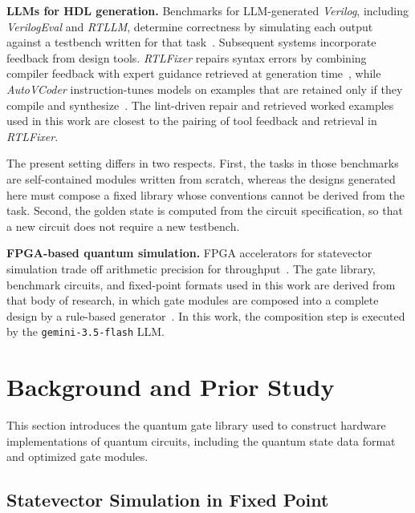 \documentclass[conference]{IEEEtran}
\begin{document}
\noindent\textbf{LLMs for HDL generation.} Benchmarks for LLM-generated \textit{Verilog},
including \textit{VerilogEval} and \textit{RTLLM}, determine correctness by simulating each
output against a testbench written for that
task~\cite{verilogeval2023,rtllm2024}. Subsequent systems incorporate
feedback from design tools. \textit{RTLFixer} repairs syntax errors by
combining compiler feedback with expert guidance retrieved at generation
time~\cite{rtlfixer2024}, while \textit{AutoVCoder} instruction-tunes models
on examples that are retained only if they compile and
synthesize~\cite{autovcoder2024}. The lint-driven repair and retrieved
worked examples used in this work are closest to the pairing of tool
feedback and retrieval in \textit{RTLFixer}. 

The present setting differs in
two respects. First, the tasks in those benchmarks are self-contained
modules written from scratch, whereas the designs generated here must
compose a fixed library whose conventions cannot be derived from the task.
Second, the golden state is computed from the circuit specification, so
that a new circuit does not require a new testbench.

\noindent\textbf{FPGA-based quantum simulation.} FPGA accelerators for statevector simulation trade off arithmetic precision for
throughput~\cite{isqed2026,hpdc26,TurnerICDM2025,vega2023fourier,liang2024pcq}. The gate library, benchmark circuits, and fixed-point formats used in this work are derived from that body of research, in which gate modules are composed into a complete design by a rule-based
generator~\cite{isqed2026}. In this work, the composition step is executed by the \texttt{gemini-3.5-flash} LLM.


\section{Background and Prior Study}
\label{sec:background}
This section introduces the quantum gate library used to construct hardware implementations of quantum circuits, including the quantum state data format and optimized gate modules.

\subsection{Statevector Simulation in Fixed Point}
\label{subsec:statevec-bg}
\end{document}
